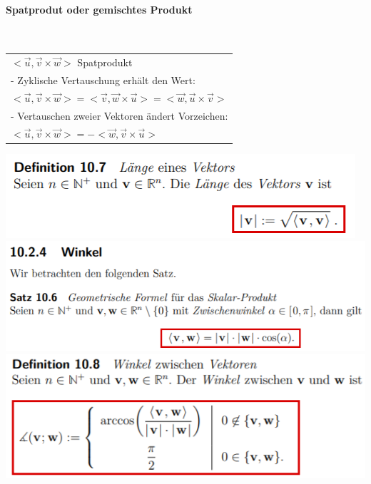 \paragraph{Spatprodut oder gemischtes Produkt}\mbox{}\\
\noindent
\begin{tabularx}{\columnwidth}{@{}X@{}}
    \hline
    $<\vec{u},\vec{v}\times\vec{w}>$ Spatprodukt                                                       \\
    - Zyklische Vertauschung erhält den Wert:                                                          \\
    $<\vec{u},\vec{v}\times\vec{w}> = <\vec{v},\vec{w}\times\vec{u}> = <\vec{w},\vec{u}\times\vec{v}>$ \\
    - Vertauschen zweier Vektoren ändert Vorzeichen:                                                   \\
    $<\vec{u},\vec{v}\times\vec{w}> = -<\vec{w},\vec{v}\times\vec{u}> $                                \\
\end{tabularx}
\includegraphics[width=\columnwidth]{./images/vek12.png}
\includegraphics[width=\columnwidth]{./images/vek13.png}
\includegraphics[width=\columnwidth]{./images/vek14.png}
